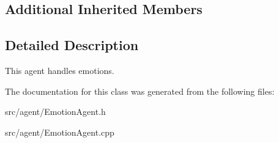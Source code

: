 \subsection*{Additional Inherited Members}


\subsection{Detailed Description}
This agent handles emotions. 

The documentation for this class was generated from the following files\+:\begin{DoxyCompactItemize}
\item 
src/agent/Emotion\+Agent.\+h\item 
src/agent/Emotion\+Agent.\+cpp\end{DoxyCompactItemize}
